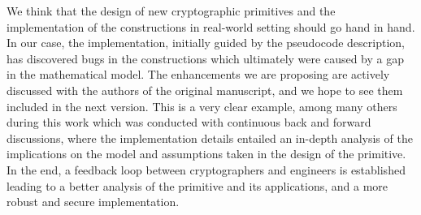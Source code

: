 We think that the design of new cryptographic primitives and
the implementation of the constructions in real-world
setting should go hand in hand. 
In our case, the implementation, 
initially guided by the pseudocode 
description, has discovered bugs in the constructions which
ultimately were caused by a gap in the mathematical model.
The enhancements we are proposing are actively discussed
with the authors of the original manuscript, and we hope
to see them included in the next version.
This is a very clear
example, among many others during this work which was conducted 
with continuous back and forward discussions, 
where the implementation details entailed 
an in-depth analysis of the implications on the model and 
assumptions taken in the design of the primitive.
In the end, a feedback loop between cryptographers and engineers 
is established leading to
a better analysis of the primitive and its applications,
and a more robust and secure implementation.
